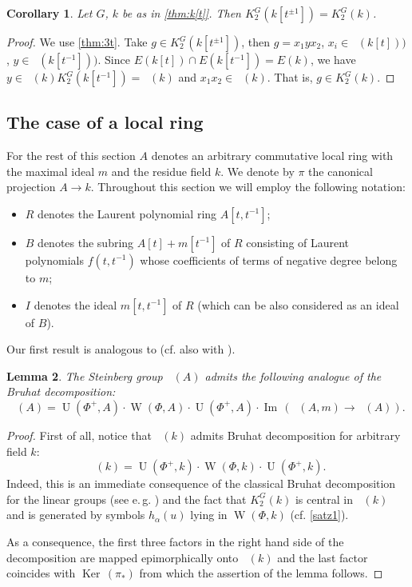 \documentclass[oneside,12pt]{amsart}
\numberwithin{equation}{section}
\newtheorem{lem}{Lemma}
\numberwithin{lem}{section}
\newtheorem{cor}[lem]{Corollary}
\theoremstyle{definition}
\theoremstyle{remark}
\DeclareMathOperator{\UU}{U}
\DeclareMathOperator{\St}{St^G}
\DeclareMathOperator{\WW}{W}
\DeclareMathOperator{\Bigker}{Ker\,}
\DeclareMathOperator{\im}{Im\,}
\begin{document}
\begin{cor} Let $G$, $k$ be as in \cref{thm:k[t]}. Then $K_2^G(k[t^{\pm 1}])=K_2^G(k)$. \end{cor}
\begin{proof} We use \cref{thm:3t}.
 Take $g\in K_2^G(k[t^{\pm 1}])$,
 then $g=x_1yx_2$, $x_i\in \St(k[t]))$, $y\in \St(k[t^{-1}]))$.
 Since $E(k[t])\cap E(k[t^{-1}])=E(k)$,
 we have $y\in\St(k)K_2^G(k[t^{-1}])=\St(k)$ and $x_1x_2\in\St(k)$. That is, $g\in K_2^G(k)$. \end{proof}

\subsection{The case of a local ring}
For the rest of this section $A$ denotes an arbitrary commutative local ring with the maximal ideal $m$ and the residue field $k$.
We denote by $\pi$ the canonical projection $A \rightarrow k$.
Throughout this section we will employ the following notation:
\begin{itemize}
 \item $R$ denotes the Laurent polynomial ring $A[t, t^{-1}]$;
 \item $B$ denotes the subring $A[t] + m[t^{-1}]$ of $R$ consisting of Laurent polynomials $f(t,t^{-1})$ whose coefficients of terms of negative degree belong to $m$;
 \item $I$ denotes the ideal $m[t, t^{-1}]$ of $R$ (which can be also considered as an ideal of $B$). \end{itemize}

Our first result is analogous to \cite[Lemma~3.1(e)]{Tu} (cf. also with \cite[\S~2.3A]{HOM}).
\begin{lem} \label{cor:bruhat} The Steinberg group $\St(A)$ admits the following analogue of the Bruhat decomposition:
\[ \St(A) = \UU(\Phi^+, A) \cdot \WW(\Phi, A) \cdot \UU(\Phi^+, A) \cdot \im(\St(A, m) \rightarrow \St(A)).\] \end{lem}
\begin{proof} First of all, notice that $\St(k)$ admits Bruhat decomposition for arbitrary field $k$:
 $$\St(k) = \UU(\Phi^+, k) \cdot \WW(\Phi, k) \cdot \UU(\Phi^+, k).$$
 Indeed, this is an immediate consequence of the classical Bruhat decomposition for the linear groups (see e.\,g. \cite[Theorem~4]{St-lect}) and the fact
 that $K_2^G(k)$ is central in $\St(k)$ and is generated by symbols $h_\alpha(u)$ lying in $\WW(\Phi, k)$ (cf. \cref{satz1}). 
 
 As a consequence, the first three factors in the right hand side of the decomposition are mapped epimorphically onto $\St(k)$ and the last factor coincides with $\Bigker(\pi_*)$
 from which the assertion of the lemma follows. \end{proof}
\end{document}
